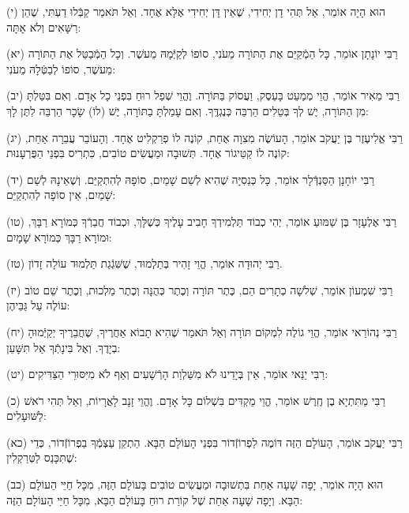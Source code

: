 \documentclass[twoside, openany, parskip=half, 11pt]{book}
\begin{document}
(י)
הוּא הָיָה אוֹמֵר, אַל תְּהִי דָן יְחִידִי, שֶׁאֵין דָּן יְחִידִי אֶלָּא אֶחָד.
וְאַל תֹּאמַר קַבְּֿלוּ דַעְתִּי, שֶׁהֵן רַשָּׁאִים וְלֹא אָתָּה:

(יא)
רַבִּי יוֹנָתָן אוֹמֵר, כָּל הַמְֿקַיֵּם אֶת הַתּוֹרָה מֵעֹנִי, סוֹפוֹ לְקַיְּֿמָהּ מֵעשֶׁר.
וְכָל הַמְֿבַטֵּל אֶת הַתּוֹרָה מֵעשֶׁר, סוֹפוֹ לְבַטְּֿלָהּ מֵעֹנִי:

(יב)
רַבִּי מֵאִיר אוֹמֵר, הֱוֵי מְמַעֵט בָּעֵסֶק, וַעֲסוֹק בַּתּוֹרָה.
וֶהֱוֵי שְׁפַל רוּחַ בִּפְנֵי כָל אָדָם.
וְאִם בִּטַּלְתָּ מִן הַתּוֹרָה, יֶשׁ לְךָ בְּטֵלִים הַרְבֵּה כְּנֶגְדֶּֽךָ.
וְאִם עָמַלְתָּ בַתּוֹרָה, יֶשׁ (לוֹ) שָׂכָר הַרְבֵּה לִתֶּן לָךְ:


(יג)
רַבִּי אֱלִיעֶזֶר בֶּן יַעֲקֹב אוֹמֵר, הָעוֹשֶׂה מִצִוָה אֶחַת, קוֹנֶה לוֹ פְרַקְלִיט אֶחָד.
וְהָעוֹבֵר עֲבֵרָה אַחַת, קוֹנֶה לוֹ קַטֵּיגוֹר אֶחָד.
תְּשׁוּבָה וּמַעֲשִׂים טוֹבִים, כִּתְרִיס בִּפְנֵי הַפֻּרְעָנוּת:

(יד)
רַבִּי יוֹחָנָן הַסַּנְדְּֿלָר אוֹמֵר, כָּל כְּנֵסִיָּה שֶׁהִיא לְשֵׁם שָׁמַיִם,
סוֹפָהּ לְהִתְקַיֵּם. וְשֶׁאֵינָהּ לְשֵׁם שָׁמַיִם, אֵין סוֹפָה לְהִתְקַיֵּם:


(טו)
רַבִּי אֶלְעָזָר בֶּן שַׁמּוּעַ אוֹמֵר, יְהִי כְבוֹד תַּלְמִידְךָ חָבִיב עָלֶיךָ כְּשֶׁלָּךְ,
וּכְבוֹד חֲבֵרְֿךָ כְּמוֹרָא רַבָּךְ,
וּמוֹרָא רַבָּךְ כְּמוֹרָא שָׁמָיִם:

(טז)
רַבִּי יְהוּדָה אוֹמֵר, הֱוֵי זָהִיר בְּתַלְמוּד, שֶׁשִּׁגְֿגַת תַּלְמוּד עוֹלָה זָדוֹן.

(יז)
רַבִּי שִׁמְעוֹן אוֹמֵר, שְׁלשָׁה כְתָרִים הֵם,
כֶּתֶר תּוֹרָה
וְכֶתֶר כְּהֻנָּה
וְכֶתֶר מַלְכוּת,
וְכֶתֶר שֵׁם טוֹב עוֹלֶה עַל גַּבֵּיהֶן:



(יח)
רַבִּי נְהוֹרַאי אוֹמֵר, הֱוֵי גוֹלֶה לִמְקוֹם תּוֹרָה וְאַל תֹּאמַר שֶׁהִיא תָבוֹא אַחֲרֶיךָ, שֶׁחֲבֵרֶיךָ יְקַיְּֿמוּהָ בְיָדֶךָ.
וְאֶל בִּינָתְֿךָ אַל תִּשָּׁעֵן:

(יט)
רַבִּי יַנַּאי אוֹמֵר, אֵין בְּיָדֵינוּ לֹא מִשַּׁלְוַת הָרְֿשָׁעִים וְאַף לֹא מִיִּסּוּרֵי הַצַּדִּיקִים:

(כ)
רַבִּי מַתִּתְיָא בֶן חֶֽרֶשׁ אוֹמֵר, הֱוֵי מַקְדִּים בִּשְׁלוֹם כָּל אָדָם.
וֶהֱוֵי זָנָב לָאֲרָיוֹת, וְאַל תְּהִי רֹאשׁ לַשּׁוּעָלִים:

(כא)
רַבִּי יַעֲקֹב אוֹמֵר, הָעוֹלָם הַזֶּה דּוֹמֶה לַפְרוֹזְֿדוֹר בִּפְנֵי הָעוֹלָם הַבָּא.
הַתְקֵן עַצְמְֿךָ בַפְרוֹזְֿדוֹר, כְּדֵי שֶׁתִּכָּנֵס לַטְּרַקְלִין:

(כב)
הוּא הָיָה אוֹמֵר, יָפָה שָׁעָה אַחַת בִּתְשׁוּבָה וּמַעֲשִׂים טוֹבִים בָּעוֹלָם הַזֶּה, מִכָּל חַיֵּי הַעוֹלָם הַבָּא.
וְיָפָה שָׁעָה אַחַת שֶׁל קוֹרַת רוּחַ בָּעוֹלָם הַבָּא, מִכָּל חַיֵּי הָעוֹלָם הַזֶּה:
\end{document}
